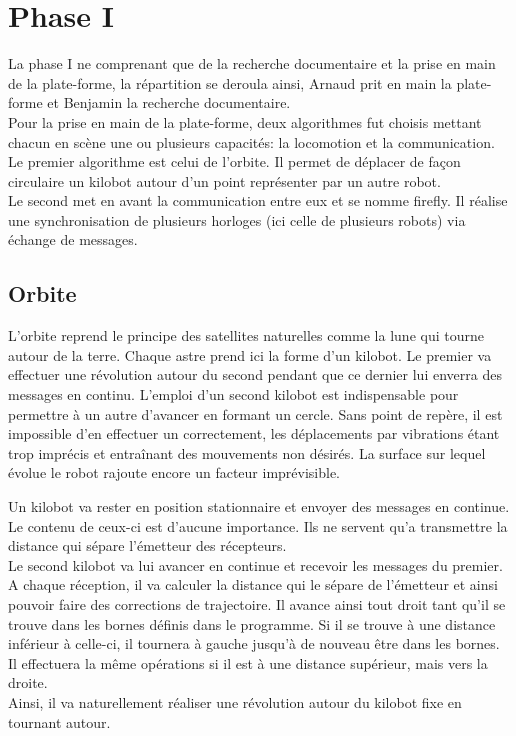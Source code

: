 \documentclass[a4paper,8pt]{report}
\begin{document}
\medskip

\section*{Phase I}\label{sec:name}

La phase I ne comprenant que de la recherche documentaire et la prise en main de la plate-forme, la r\'epartition se deroula ainsi, Arnaud prit en main la plate-forme et Benjamin la recherche documentaire.\\
Pour la prise en main de la plate-forme, deux algorithmes fut choisis mettant chacun en scène une ou plusieurs capacités: la locomotion et la communication.\\
Le premier algorithme est celui de l'orbite. Il permet de déplacer de façon circulaire un kilobot autour d'un point représenter par un autre robot.\\
Le second met en avant la communication entre eux et se nomme firefly. Il réalise une synchronisation de plusieurs horloges (ici celle de plusieurs robots) via échange de messages.\\

\subsection*{Orbite}\label{subsec:name}

L'orbite reprend le principe des satellites naturelles comme la lune qui tourne autour de la terre. Chaque astre prend ici la forme d'un kilobot. Le premier va effectuer une révolution autour du second pendant que ce dernier lui enverra des messages en continu. L'emploi d'un second kilobot est indispensable pour permettre à un autre d'avancer en formant un cercle. Sans point de repère, il est impossible d'en effectuer un correctement, les déplacements par vibrations étant trop imprécis et entraînant des mouvements non désirés. La surface sur lequel évolue le robot rajoute encore un facteur imprévisible.

Un kilobot va rester en position stationnaire et envoyer des messages en continue. Le contenu de ceux-ci est d'aucune importance. Ils ne servent qu'a transmettre la distance qui sépare l’émetteur des récepteurs.\\
Le second kilobot va lui avancer en continue et recevoir les messages du premier. A chaque réception, il va calculer la distance qui le sépare de l'émetteur et ainsi pouvoir faire des corrections de trajectoire. Il avance ainsi tout droit tant qu'il se trouve dans les bornes définis dans le programme. Si il se trouve à une distance inférieur à celle-ci, il tournera à gauche jusqu’à de nouveau être dans les bornes. Il effectuera la même opérations si il est à une distance supérieur, mais vers la droite.\\
Ainsi, il va naturellement réaliser une révolution autour du kilobot fixe en tournant autour.\\
\end{document}
